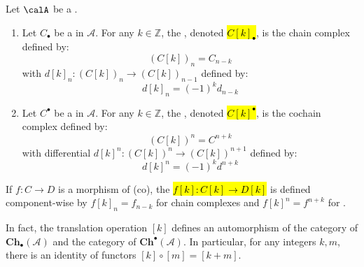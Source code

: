 \begin{definition} \label{definition:translation_of_chain_cochain_complex_in_preadditive_category}
    Let $\calA$ be a .
    \begin{enumerate}
        \item Let $C_{\bullet}$ be a  in $\mathcal{A}$. For any $k \in \mathbb{Z}$, the , denoted \hl{$C[k]_{\bullet}$}, is the chain complex defined by:
        $$(C[k])_n = C_{n-k}$$
        with  $d[k]_n: (C[k])_n \to (C[k])_{n-1}$ defined by:
        $$d[k]_n = (-1)^k d_{n-k}$$

        \item Let $C^{\bullet}$ be a  in $\mathcal{A}$. For any $k \in \mathbb{Z}$, the , denoted \hl{$C[k]^{\bullet}$}, is the cochain complex defined by:
        $$(C[k])^n = C^{n+k}$$
        with differential $d[k]^n: (C[k])^n \to (C[k])^{n+1}$ defined by:
        $$d[k]^n = (-1)^k d^{n+k}$$
    \end{enumerate}

    If $f: C \to D$ is a morphism of (co), the  \hl{$f[k]: C[k] \to D[k]$} is defined component-wise by $f[k]_n = f_{n-k}$ for chain complexes and $f[k]^n = f^{n+k}$ for .

    In fact, the translation operation $[k]$ defines an  automorphism of the category of  $\mathbf{Ch}_\bullet(\mathcal{A})$ and the category of  $\mathbf{Ch}^\bullet(\mathcal{A})$. In particular, for any integers $k, m$, there is an identity of functors $[k] \circ [m] = [k+m]$.
\end{definition}